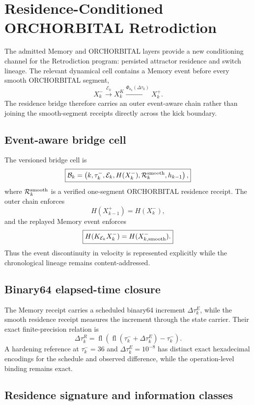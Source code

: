 \chapter{Residence-Conditioned ORCHORBITAL Retrodiction}

The admitted Memory and ORCHORBITAL layers provide a new conditioning channel for the Retrodiction program: persisted attractor residence and switch lineage. The relevant dynamical cell contains a Memory event before every smooth ORCHORBITAL segment,
\[
X_k^-
\xrightarrow{\mathcal E_k}
X_k^{K}
\xrightarrow{\Phi_{a_k}(\Delta\tau_k)}
X_k^+.
\]
The residence bridge therefore carries an outer event-aware chain rather than joining the smooth-segment receipts directly across the kick boundary.

\section{Event-aware bridge cell}

The versioned bridge cell is
\[
\boxed{
\mathcal B_k=
\left(
 k,
 \tau_k^-,
 \mathcal E_k,
 H(X_k^-),
 \mathcal R_k^{\rm smooth},
 h_{k-1}
\right),
}
\]
where \(\mathcal R_k^{\rm smooth}\) is a verified one-segment ORCHORBITAL residence receipt. The outer chain enforces
\[
\boxed{H(X_{k-1}^+)=H(X_k^-)},
\]
and the replayed Memory event enforces
\[
\boxed{
H(K_{\mathcal E_k}X_k^-)
=H(X_{k,\rm smooth}^-).
}
\]
Thus the event discontinuity in velocity is represented explicitly while the chronological lineage remains content-addressed.

\section{Binary64 elapsed-time closure}

The Memory receipt carries a scheduled binary64 increment \(\Delta\tau_k^E\), while the smooth residence receipt measures the increment through the state carrier. Their exact finite-precision relation is
\[
\boxed{
\Delta\tau_k^R
=
\operatorname{fl}
\left(
\operatorname{fl}(\tau_k^-+\Delta\tau_k^E)-\tau_k^-
\right).
}
\]
A hardening reference at \(\tau_k^-=36\) and \(\Delta\tau_k^E=10^{-8}\) has distinct exact hexadecimal encodings for the schedule and observed difference, while the operation-level binding remains exact.

\section{Residence signature and information classes}

